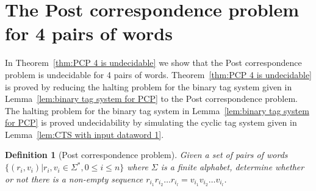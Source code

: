 \documentclass[11pt]{article} \usepackage{amsfonts,amsmath,amssymb,amsthm}
\newtheorem{definition}{Definition}
\begin{document}
\section{The Post correspondence problem for 4 pairs of words}
In Theorem~\ref{thm:PCP 4 is undecidable} we show that the Post correspondence problem is undecidable for 4 pairs of words. Theorem~\ref{thm:PCP 4 is undecidable} is proved by reducing the halting problem for the binary tag system given in Lemma~\ref{lem:binary tag system for PCP} to the Post correspondence problem. The halting problem for the binary tag system in Lemma~\ref{lem:binary tag system for PCP} is proved undecidability by simulating the cyclic tag system given in Lemma~\ref{lem:CTS with input dataword 1}. 

\begin{definition}[Post correspondence problem]\label{def:PCP}
Given a set of pairs of words $\{(r_i,v_i)| r_i,v_i\in\Sigma^\ast, 0\leqslant i\leqslant n\}$ where $\Sigma$ is a finite alphabet, determine whether or not there is a non-empty sequence $r_{i_1}r_{i_2}\ldots r_{i_l}=v_{i_1}v_{i_2}\ldots v_{i_l}$. 
\end{definition}
\end{document}
